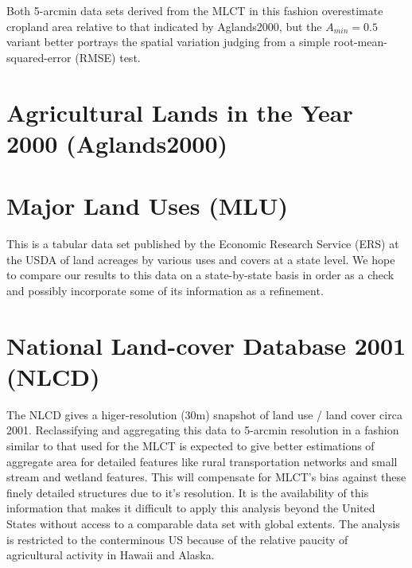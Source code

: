 Both 5-arcmin data sets derived from the MLCT in this fashion
overestimate cropland area relative to that indicated by Aglands2000,
but the $A_{min} = 0.5$ variant better portrays the spatial variation
judging from a simple root-mean-squared-error (RMSE)
test. 

\section{Agricultural Lands in the Year 2000 (Aglands2000)}
\label{sec:aglands2000}

\citet{Ramankutty2008}

  

  
\section{Major Land Uses (MLU)}
\label{sec:mlu}

This is a tabular data set published by the Economic Research Service
(ERS) at the USDA of land acreages by various uses and covers at a
state level.  We hope to compare our results to this data on a
state-by-state basis in order as a check and possibly incorporate some
of its information as a refinement.


\section{National Land-cover Database 2001 (NLCD)}
\label{sec:nlcd}

\citet{Homer2004}


The NLCD gives a higer-resolution (30m) snapshot of land use / land
cover circa 2001.    Reclassifying and aggregating this
data to 5-arcmin resolution in a fashion similar to that used for the
MLCT is expected to give better estimations of aggregate area for
detailed features like rural transportation networks and small stream
and wetland features.  This will compensate for MLCT's bias against
these finely detailed structures due to it's resolution.  It is the
availability of this information that makes it difficult to apply this
analysis beyond the United States without access to a comparable data
set with global extents.  The analysis is restricted to the
conterminous US because of the relative paucity of agricultural
activity in Hawaii and Alaska.


